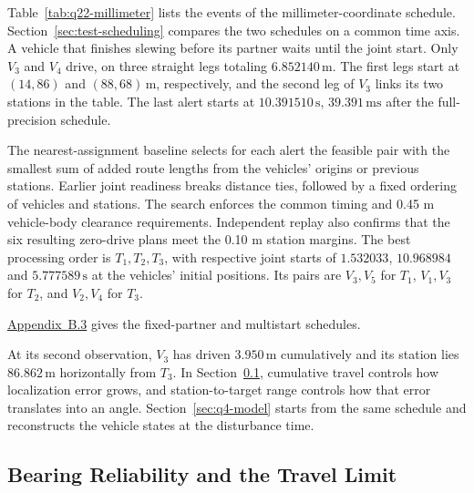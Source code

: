 \documentclass{swmcmthesis}
\begin{document}
Table~\ref{tab:q22-millimeter} lists the events of the millimeter-coordinate schedule. Section~\ref{sec:test-scheduling} compares the two schedules on a common time axis. A vehicle that finishes slewing before its partner waits until the joint start. Only \(V_3\) and \(V_4\) drive, on three straight legs totaling \(6.852140\,\mathrm m\). The first legs start at \((14,86)\) and \((88,68)\,\mathrm m\), respectively, and the second leg of \(V_3\) links its two stations in the table. The last alert starts at \(10.391510\,\mathrm s\), \(39.391\,\mathrm{ms}\) after the full-precision schedule.

The nearest-assignment baseline selects for each alert the feasible pair with the smallest sum of added route lengths from the vehicles' origins or previous stations. Earlier joint readiness breaks distance ties, followed by a fixed ordering of vehicles and stations. The search enforces the common timing and 0.45 m vehicle-body clearance requirements. Independent replay also confirms that the six resulting zero-drive plans meet the 0.10 m station margins. The best processing order is \(T_1,T_2,T_3\), with respective joint starts of \(1.532033\), \(10.968984\) and \(5.777589\,\mathrm s\) at the vehicles' initial positions. Its pairs are \(V_3,V_5\) for \(T_1\), \(V_1,V_3\) for \(T_2\), and \(V_2,V_4\) for \(T_3\).

\hyperref[app:q22-alternatives]{Appendix~B.3} gives the fixed-partner and multistart schedules.

At its second observation, \(V_3\) has driven \(3.950\,\mathrm m\) cumulatively and its station lies \(86.862\,\mathrm m\) horizontally from \(T_3\). In Section~\ref{sec:q3-model}, cumulative travel controls how localization error grows, and station-to-target range controls how that error translates into an angle. Section~\ref{sec:q4-model} starts from the same schedule and reconstructs the vehicle states at the disturbance time.

\subsection{Bearing Reliability and the Travel Limit}
\label{sec:q3-model}
\end{document}
